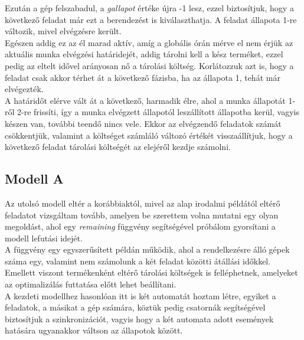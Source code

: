\documentclass {report}
\begin{document}
Ezután a gép felszabadul, a \emph{gallapot} értéke újra -1 lesz, ezzel biztosítjuk, hogy a következő feladat már ezt a berendezést is kiválaszthatja. A feladat állapota 1-re változik, mivel elvégzésre került.\\
Egészen addig ez az él marad aktív, amíg a globális órán mérve el nem érjük az aktuális munka elvégzési határidejét, addig tárolni kell a kész terméket, ezzel pedig az eltelt idővel arányosan nő a tárolási költség. Korlátozzuk azt is, hogy a feladat csak akkor térhet át a következő fázisba, ha az állapota 1, tehát már elvégezték. \\
A határidőt elérve vált át a következő, harmadik élre, ahol a munka állapotát 1-ről 2-re frissíti, így a munka elvégzett állapotól leszállított állapotba kerül, vagyis készen van, további teendő nincs vele. Ekkor az elvégzendő feladatok számát csökkentjük, valamint a költséget számláló változó értékét visszaállítjuk, hogy a következő feladat tárolási költségét az elejéről kezdje számolni.

\subsection{Modell A}
Az utolsó modell eltér a korábbiaktól, mivel az alap irodalmi példától eltérő feladatot vizsgáltam tovább, amelyen be szerettem volna mutatni egy olyan megoldást, ahol egy \emph{remaining} függvény segítségével próbálom gyorsítani a modell lefutási idejét. \\
A függvény egy egyszerűsített példán működik, ahol a rendelkezésre álló gépek száma egy, valamint nem számolunk a két feladat közötti átállási időkkel. Emellett viszont termékenként eltérő tárolási költségek is felléphetnek, amelyeket az optimalizálás futtatása előtt lehet beállítani.\\
A kezdeti modellhez hasonlóan itt is két automatát hoztam létre, egyiket a feladatok, a másikat a gép számára, köztük pedig csatornák segítségével biztosítjuk a szinkronizációt, vagyis hogy a két automata adott események hatására ugyanakkor váltson az állapotok között.
\end{document}
